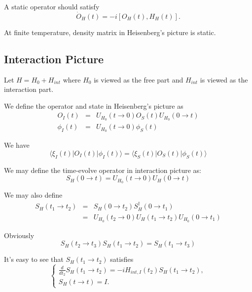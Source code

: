 \documentclass[12pt]{book}
\begin{document}
	A static operator should satisfy
	\begin{equation}
		\dot O_H(t)=-i[O_H(t),H_H(t)].
	\end{equation}	
	
	At finite temperature, density matrix in Heisenberg's picture is static.
	
	\subsection{Interaction Picture}
	Let $H=H_0+H_{int}$ where $H_0$ is viewed as the free part and $H_{int}$ is viewed as the interaction part.
	
	We define the operator and state in Heisenberg's picture as
	\begin{eqnarray}
		O_I(t)&=&U_{H_0}(t\rightarrow 0)O_S(t)U_{H_0}(0\rightarrow t)\\
		\phi_I(t)&=&U_{H_0}(t\rightarrow 0)\phi_S(t)
	\end{eqnarray}
	
	We have
	\begin{equation}
		\langle \xi_I(t)|O_I(t)|\phi_I(t)\rangle=\langle \xi_S(t)|O_S(t)|\phi_S(t)\rangle
	\end{equation}
	
	We may define the time-evolve operator in interaction picture as:
	\begin{equation}
		S_H(0\rightarrow t)=U_{H_0}(t\rightarrow 0)U_H(0\rightarrow t)
	\end{equation}
	
	We may also define
	\begin{eqnarray}
		S_H(t_1\rightarrow t_2)&=&S_H(0\rightarrow t_2)S_H^\dagger(0\rightarrow t_1)\\
		&=&U_{H_0}(t_2\rightarrow 0)U_H(t_1\rightarrow t_2)U_{H_0}(0\rightarrow t_1)
	\end{eqnarray}
	
	Obviously
	\begin{equation}
		S_H(t_2\rightarrow t_3)S_H(t_1\rightarrow t_2)=S_H(t_1\rightarrow t_3)
	\end{equation}
	
	It's easy to see that $S_H(t_1\rightarrow t_2)$ satisfies
	\begin{equation}
		\left\{\begin{array}{l}
			\frac d {dt_2} S_H(t_1\rightarrow t_2)=-iH_{int,I}(t_2)S_H(t_1\rightarrow t_2),\\
			S_H(t\rightarrow t)=I .
		\end{array}  \right. \label{eqn:s_evolve}
	\end{equation}
	
\end{document}
